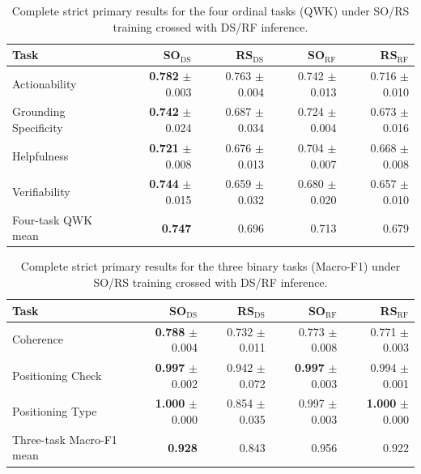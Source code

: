 \begin{table}[t]
\centering
\normalsize
\setlength{\tabcolsep}{4pt}
\begin{tabular}{lrrrr}
\toprule
Task & SO$_{\mathrm{DS}}$ & RS$_{\mathrm{DS}}$ & SO$_{\mathrm{RF}}$ & RS$_{\mathrm{RF}}$ \\
\midrule
Actionability & \textbf{0.782} $\pm$ 0.003 & 0.763 $\pm$ 0.004 & 0.742 $\pm$ 0.013 & 0.716 $\pm$ 0.010 \\
Grounding Specificity & \textbf{0.742} $\pm$ 0.024 & 0.687 $\pm$ 0.034 & 0.724 $\pm$ 0.004 & 0.673 $\pm$ 0.016 \\
Helpfulness & \textbf{0.721} $\pm$ 0.008 & 0.676 $\pm$ 0.013 & 0.704 $\pm$ 0.007 & 0.668 $\pm$ 0.008 \\
Verifiability & \textbf{0.744} $\pm$ 0.015 & 0.659 $\pm$ 0.032 & 0.680 $\pm$ 0.020 & 0.657 $\pm$ 0.010 \\
\midrule
Four-task QWK mean & \textbf{0.747} & 0.696 & 0.713 & 0.679 \\
\bottomrule
\end{tabular}
\caption{Complete strict primary results for the four ordinal tasks (QWK) under SO/RS training crossed with DS/RF inference.}
\label{tab:full-so-rs-strict-qwk}
\end{table}

\begin{table}[t]
\centering
\normalsize
\setlength{\tabcolsep}{4pt}
\begin{tabular}{lrrrr}
\toprule
Task & SO$_{\mathrm{DS}}$ & RS$_{\mathrm{DS}}$ & SO$_{\mathrm{RF}}$ & RS$_{\mathrm{RF}}$ \\
\midrule
Coherence & \textbf{0.788} $\pm$ 0.004 & 0.732 $\pm$ 0.011 & 0.773 $\pm$ 0.008 & 0.771 $\pm$ 0.003 \\
Positioning Check & \textbf{0.997} $\pm$ 0.002 & 0.942 $\pm$ 0.072 & \textbf{0.997} $\pm$ 0.003 & 0.994 $\pm$ 0.001 \\
Positioning Type & \textbf{1.000} $\pm$ 0.000 & 0.854 $\pm$ 0.035 & 0.997 $\pm$ 0.003 & \textbf{1.000} $\pm$ 0.000 \\
\midrule
Three-task Macro-F1 mean & \textbf{0.928} & 0.843 & 0.956 & 0.922 \\
\bottomrule
\end{tabular}
\caption{Complete strict primary results for the three binary tasks (Macro-F1) under SO/RS training crossed with DS/RF inference.}
\label{tab:full-so-rs-strict-f1}
\end{table}

